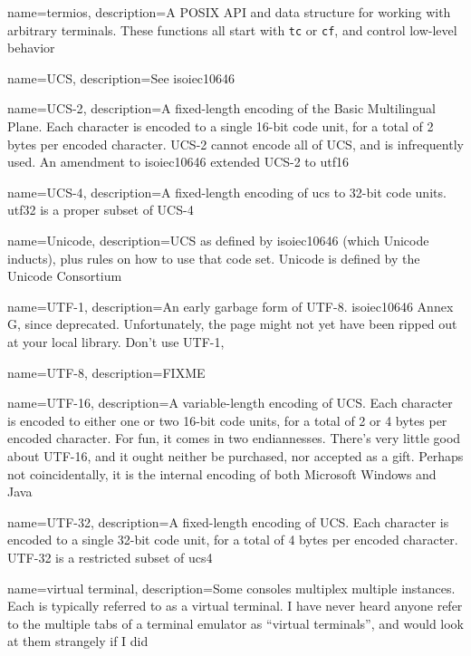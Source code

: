 {
  name={termios},
description={A POSIX API and data structure for working with arbitrary terminals.
  These functions all start with \texttt{tc} or \texttt{cf}, and control low-level behavior}
}

{
  name={UCS},
  description={See \Gls{isoiec10646}}
}

{
  name={UCS-2},
description={A fixed-length encoding of the Basic Multilingual Plane. Each
  character is encoded to a single 16-bit code unit, for a total of 2 bytes
  per encoded character. UCS-2 cannot encode all of UCS, and is infrequently
  used. An amendment to \Gls{isoiec10646} extended UCS-2 to \Gls{utf16}}
}

{
  name={UCS-4},
description={A fixed-length encoding of \Gls{ucs} to 32-bit code units.
  \Gls{utf32} is a proper subset of UCS-4\cite{rfc3629}}
}

{
  name={Unicode},
description={UCS as defined by \Gls{isoiec10646} (which Unicode inducts), plus
  rules on how to use that code set. Unicode is defined by the Unicode
  Consortium}
}

{
  name={UTF-1},
description={An early garbage form of UTF-8. \Gls{isoiec10646} Annex G, since deprecated.
  Unfortunately, the page might not yet have been ripped out at your local
  library. Don't use UTF-1},
}

{
  name={UTF-8},
description={FIXME}
}

{
  name={UTF-16},
description={A variable-length encoding of UCS. Each character is encoded to
  either one or two 16-bit code units, for a total of 2 or 4 bytes per
  encoded character. For fun, it comes in two endiannesses. There's very little
  good about UTF-16, and it ought neither be purchased, nor accepted as a gift.
  Perhaps not coincidentally, it is the internal encoding of both Microsoft
  Windows and Java}
}

{
  name={UTF-32},
description={A fixed-length encoding of UCS. Each character is encoded to a
  single 32-bit code unit, for a total of 4 bytes per encoded character. UTF-32
  is a restricted subset of \Gls{ucs4}\cite{rfc3629}}
}

{
  name={virtual terminal},
description={Some consoles multiplex multiple instances. Each is
  typically referred to as a virtual terminal. I have never heard anyone
  refer to the multiple tabs of a terminal emulator as ``virtual terminals'',
  and would look at them strangely if I did}
}

